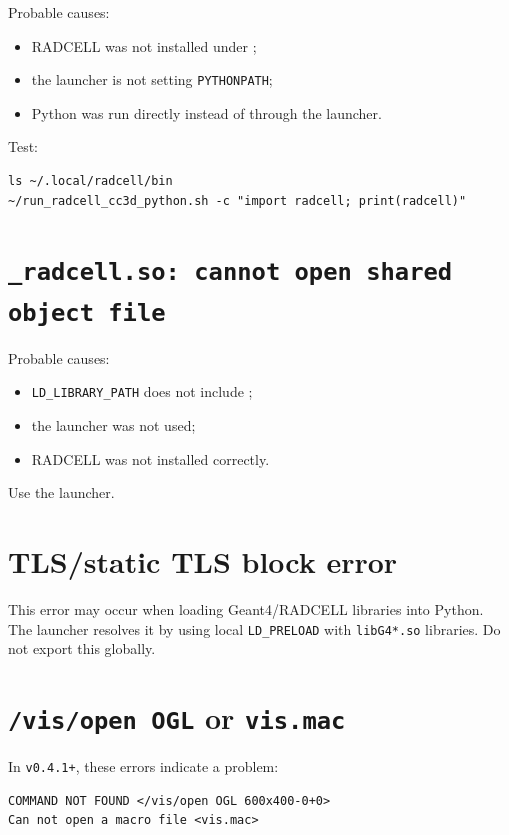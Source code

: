 \documentclass[11pt,a4paper,twoside,pdftex]{refrep}
\begin{document}
Probable causes:

\begin{itemize}
  \item RADCELL was not installed under ;
  \item the launcher is not setting \texttt{PYTHONPATH};
  \item Python was run directly instead of through the launcher.
\end{itemize}

Test:

\begin{lstlisting}
ls ~/.local/radcell/bin
~/run_radcell_cc3d_python.sh -c "import radcell; print(radcell)"
\end{lstlisting}

\section{\texttt{\_radcell.so: cannot open shared object file}}

Probable causes:

\begin{itemize}
  \item \texttt{LD\_LIBRARY\_PATH} does not include ;
  \item the launcher was not used;
  \item RADCELL was not installed correctly.
\end{itemize}

Use the launcher.

\section{TLS/static TLS block error}

This error may occur when loading Geant4/RADCELL libraries into Python. The launcher resolves it by using local \texttt{LD\_PRELOAD} with \texttt{libG4*.so} libraries. Do not export this globally.

\section{\texttt{/vis/open OGL} or \texttt{vis.mac}}

In \texttt{v0.4.1+}, these errors indicate a problem:

\begin{lstlisting}
COMMAND NOT FOUND </vis/open OGL 600x400-0+0>
Can not open a macro file <vis.mac>
\end{lstlisting}
\end{document}
